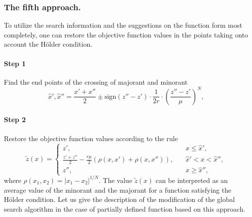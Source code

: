 \documentclass[runningheads]{llncs}
\begin{document}
\subsubsection{The fifth approach.} To utilize the search information and the suggestions on the function form most completely, one can restore the objective function values in the points taking onto account the H{\"o}lder condition.
\paragraph{Step 1} Find the end points of the crossing of majorant and minorant
\begin{equation}\label{eq18} 
\hat{x}',\hat{x}''=\frac {x'+x''}{2}\pm \text{sign}(z''-z')\cdot \frac {1}{2r} \cdot {\left(\frac {z''-z'}{\mu}\right)}^N,
\end{equation}
\paragraph{Step 2} Restore the objective function values according to the rule
\begin{equation}\label{eq19} 
\tilde{z}(x)=
  \begin{cases}
    z', & {\quad x \leq \hat{x}',}\\
    \frac {z'+z''}{2}- \frac {r \mu}{2} (\rho(x,x')  + \rho(x,x'')), & {\quad \hat{x}' < x < \hat{x}'',}\\
    z'',  & {\quad x \geq \hat{x}'',}
  \end{cases}
\end{equation}
where $\rho(x_1,x_2) =  |x_1 - x_2|^{1/N}$.
The value $\tilde{z}(x)$ can be interpreted as an average value of the minorant and the majorant for a function satisfying the H{\"o}lder condition. Let us give the description of the modification of the global search algorithm in the case of partially defined function based on this approach.
\end{document}
